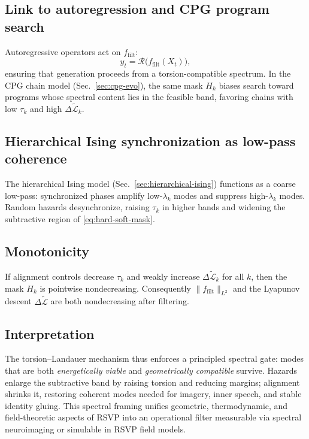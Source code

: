 \documentclass[a4paper,11pt]{article}
\begin{document}
\subsection{Link to autoregression and CPG program search}
Autoregressive operators act on $f_{\mathrm{filt}}$:
\[
y_t=\mathcal{R}\big(f_{\mathrm{filt}}(X_t)\big),
\]
ensuring that generation proceeds from a torsion-compatible spectrum. In the
CPG chain model (Sec.~\ref{sec:cpg-evo}), the same mask $H_k$ biases search
toward programs whose spectral content lies in the feasible band, favoring
chains with low $\tau_k$ and high $\Delta\widetilde{\mathcal{L}}_k$.

\subsection{Hierarchical Ising synchronization as low-pass coherence}
The hierarchical Ising model (Sec.~\ref{sec:hierarchical-ising}) functions as a
coarse low-pass: synchronized phases amplify low-$\lambda_k$ modes and suppress
high-$\lambda_k$ modes. Random hazards desynchronize, raising $\tau_k$ in higher
bands and widening the subtractive region of
\eqref{eq:hard-soft-mask}.

\subsection{Monotonicity}
\begin{proposition}
If alignment controls decrease $\tau_k$ and weakly increase
$\Delta\widetilde{\mathcal{L}}_k$ for all $k$, then the mask $H_k$ is
pointwise nondecreasing. Consequently $\|f_{\mathrm{filt}}\|_{L^2}$ and the
Lyapunov descent $\Delta\widetilde{\mathcal{L}}$ are both nondecreasing after
filtering.
\end{proposition}

\subsection{Interpretation}
The torsion--Landauer mechanism thus enforces a principled spectral gate:
modes that are both \emph{energetically viable} and \emph{geometrically
compatible} survive. Hazards enlarge the subtractive band by raising torsion
and reducing margins; alignment shrinks it, restoring coherent modes needed for
imagery, inner speech, and stable identity gluing. This spectral framing unifies
geometric, thermodynamic, and field-theoretic aspects of RSVP into an
operational filter measurable via spectral neuroimaging or simulable in RSVP
field models.
\end{document}
